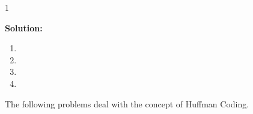 \documentclass[9pt]{article}
\def\solutions{1}
\begin{document}
\if\solutions1
\vspace{2mm}

\textbf{Solution:} \\

\begin{enumerate}
    \item
    \item
    \item 
    
    
    \item
\end{enumerate}


\fi
\newpage



\vspace{5mm}

\item The following problems deal with the concept of Huffman Coding.
\end{document}
